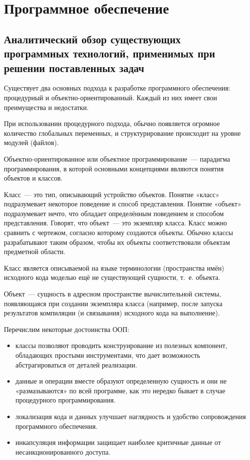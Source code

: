\newpage
\section{Программное обеспечение}

\subsection{Аналитический обзор существующих программных технологий, применимых при решении поставленных задач}

Существует два основных подхода к разработке программного обеспечения: процедурный и объектно-ориентированный.
Каждый из них имеет свои преимущества и недостатки.

При использовании процедурного подхода, обычно появляется огромное количество глобальных переменных, и структурирование
происходит на уровне модулей (файлов).

Объектно-ориентированное или объектное программирование — парадигма программирования, в которой основными концепциями
являются понятия объектов и классов.

Класс — это тип, описывающий устройство объектов. Понятие «класс» подразумевает некоторое поведение и способ представления.
Понятие «объект» подразумевает нечто, что обладает определённым поведением и способом представления. Говорят, что объект — это экземпляр класса. Класс можно сравнить с чертежом, согласно которому создаются объекты. Обычно классы разрабатывают таким образом, чтобы их объекты соответствовали объектам предметной области.

Класс является описываемой на языке терминологии (пространства имён) исходного кода моделью ещё не существующей сущности,
т. е. объекта.

Объект — сущность в адресном пространстве вычислительной системы, появляющаяся при создании экземпляра класса (например,
после запуска результатов компиляции (и связывания) исходного кода на выполнение).

Перечислим некоторые достоинства ООП:
\begin{itemize}
  \item классы позволяют проводить конструирование из полезных компонент, обладающих простыми инструментами,
    что дает возможность абстрагироваться от деталей реализации.
  \item данные и операции вместе образуют определенную сущность и они не «размазываются» по всей программе,
    как это нередко бывает в случае процедурного программирования.
  \item локализация кода и данных улучшает наглядность и удобство сопровождения программного обеспечения.
  \item инкапсуляция информации защищает наиболее критичные данные от несанкционированного доступа.
\end{itemize}

